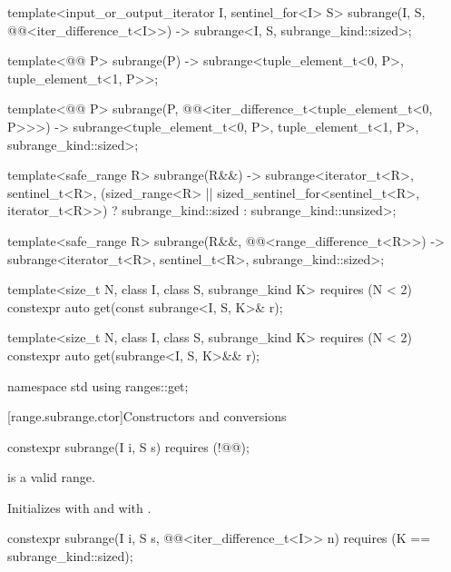 \begin{codeblock}
{  template<input_or_output_iterator I, sentinel_for<I> S>
    subrange(I, S, @@<iter_difference_t<I>>) ->
      subrange<I, S, subrange_kind::sized>;

  template<@@ P>
    subrange(P) -> subrange<tuple_element_t<0, P>, tuple_element_t<1, P>>;

  template<@@ P>
    subrange(P, @@<iter_difference_t<tuple_element_t<0, P>>>) ->
      subrange<tuple_element_t<0, P>, tuple_element_t<1, P>, subrange_kind::sized>;

  template<safe_range R>
    subrange(R&&) ->
      subrange<iterator_t<R>, sentinel_t<R>,
               (sized_range<R> || sized_sentinel_for<sentinel_t<R>, iterator_t<R>>)
                 ? subrange_kind::sized : subrange_kind::unsized>;

  template<safe_range R>
    subrange(R&&, @@<range_difference_t<R>>) ->
      subrange<iterator_t<R>, sentinel_t<R>, subrange_kind::sized>;

  template<size_t N, class I, class S, subrange_kind K>
    requires (N < 2)
    constexpr auto get(const subrange<I, S, K>& r);

  template<size_t N, class I, class S, subrange_kind K>
    requires (N < 2)
    constexpr auto get(subrange<I, S, K>&& r);
}

namespace std {
  using ranges::get;
}
\end{codeblock}

[range.subrange.ctor]{Constructors and conversions}

%
\begin{itemdecl}
constexpr subrange(I i, S s) requires (!@@);
\end{itemdecl}

\begin{itemdescr}
\pnum
\expects
{} is a valid range.

\pnum
\effects
Initializes  with  and  with
.
\end{itemdescr}

%
\begin{itemdecl}
constexpr subrange(I i, S s, @@<iter_difference_t<I>> n)
  requires (K == subrange_kind::sized);
\end{itemdecl}

